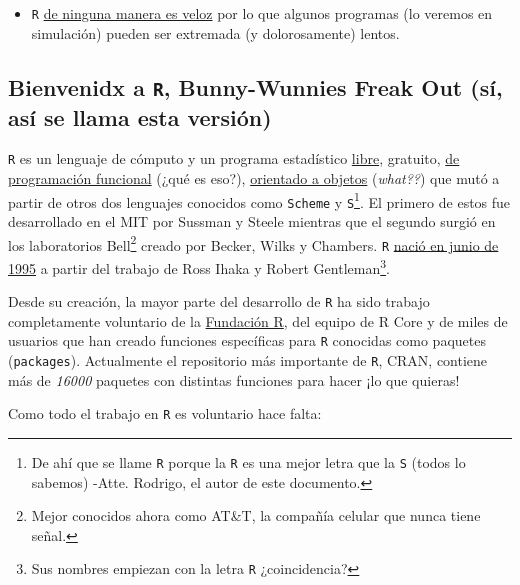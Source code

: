 \documentclass[
]{book}
\providecommand{\tightlist}{%
  \setlength{\itemsep}{0pt}\setlength{\parskip}{0pt}}
\begin{document}
\begin{itemize}
\tightlist
\item
  \texttt{R} \href{https://github.com/matthieugomez/benchmark-stata-r}{de ninguna manera es veloz} por lo que algunos programas (lo veremos en simulación) pueden ser extremada (y dolorosamente) lentos.
\end{itemize}

\hypertarget{bienvenidx-a-r-bunny-wunnies-freak-out-suxed-asuxed-se-llama-esta-versiuxf3n}{%
\subsection{\texorpdfstring{Bienvenidx a \texttt{R}, Bunny-Wunnies Freak Out (sí, así se llama esta versión)}{Bienvenidx a R, Bunny-Wunnies Freak Out (sí, así se llama esta versión)}}\label{bienvenidx-a-r-bunny-wunnies-freak-out-suxed-asuxed-se-llama-esta-versiuxf3n}}

\texttt{R} es un lenguaje de cómputo y un programa estadístico \href{https://www.gnu.org/philosophy/free-sw.html}{libre}, gratuito, \href{http://adv-r.had.co.nz/Functional-programming.html}{de programación funcional} (¿qué es eso?), \href{https://en.wikipedia.org/wiki/Object-oriented_programming}{orientado a objetos} (\emph{what??}) que mutó a partir de otros dos lenguajes conocidos como \texttt{Scheme} y \texttt{S}\footnote{De ahí que se llame \texttt{R} porque la \texttt{R} es una mejor letra que la \texttt{S} (todos lo sabemos)
  -Atte. Rodrigo, el autor de este documento.}. El primero de estos fue desarrollado en el MIT por Sussman y Steele mientras que el segundo surgió en los laboratorios Bell\footnote{Mejor conocidos ahora como AT\&T, la compañía celular que nunca tiene señal.} creado por Becker, Wilks y Chambers. \texttt{R} \href{https://cran.r-project.org/doc/html/interface98-paper/paper_2.html}{nació en junio de 1995} a partir del trabajo de Ross Ihaka y Robert Gentleman\footnote{Sus nombres empiezan con la letra \texttt{R} ¿coincidencia?}.

Desde su creación, la mayor parte del desarrollo de \texttt{R} ha sido trabajo completamente voluntario de la \href{https://www.r-project.org/foundation/}{Fundación R}, del equipo de R Core y de miles de usuarios que han creado funciones específicas para \texttt{R} conocidas como paquetes (\texttt{packages}). Actualmente el repositorio más importante de \texttt{R}, CRAN, contiene más de \emph{16000} paquetes con distintas funciones para hacer ¡lo que quieras!

Como todo el trabajo en \texttt{R} es voluntario hace falta:
\end{document}

